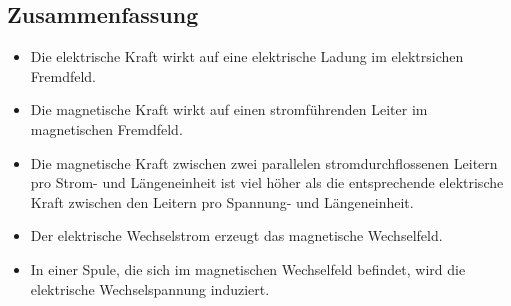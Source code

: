 \subsection{Zusammenfassung}

\begin{itemize}
\item Die elektrische Kraft wirkt auf eine elektrische Ladung im elektrsichen Fremdfeld.
\item Die magnetische Kraft wirkt auf einen stromführenden Leiter im magnetischen Fremdfeld.
\item Die magnetische Kraft zwischen zwei parallelen stromdurchflossenen Leitern pro Strom- und Längeneinheit ist viel höher als die entsprechende elektrische Kraft zwischen den Leitern pro Spannung- und Längeneinheit.
\item Der elektrische Wechselstrom erzeugt das magnetische Wechselfeld.
\item In einer Spule, die sich im magnetischen Wechselfeld befindet, wird die elektrische Wechselspannung induziert.
\end{itemize}